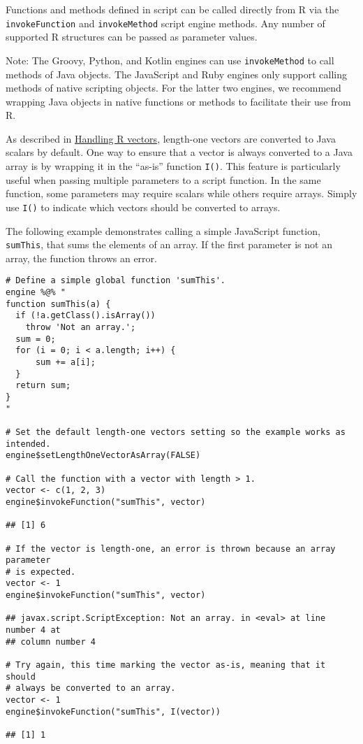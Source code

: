 \documentclass[
article,
11pt, %
a4paper, %
oneside, %
headinclude,footinclude, %
]{scrartcl}
\theoremstyle{definition} %
\theoremstyle{plain} %
\theoremstyle{remark} %
\newcommand{\code}[1]{\texttt{#1}}
\newcommand{\strong}[1]{\texorpdfstring{{\normalfont\fontseries{b}\selectfont #1}}{#1}}
\begin{document}
Functions and methods defined in script can be called directly from R via the \code{invokeFunction} and \code{invokeMethod} script engine methods. Any number of supported R structures can be passed as parameter values.

\strong{Note:} The Groovy, Python, and Kotlin engines can use \code{invokeMethod} to call methods of Java objects. The JavaScript and Ruby engines only support calling methods of native scripting objects. For the latter two engines, we recommend wrapping Java objects in native functions or methods to facilitate their use from R.

As described in \hyperlink{handling-r-vectors}{Handling R vectors}, length-one vectors are converted to Java scalars by default. One way to ensure that a vector is always converted to a Java array is by wrapping it in the ``as-is'' function \code{I()}. This feature is particularly useful when passing multiple parameters to a script function. In the same function, some parameters may require scalars while others require arrays. Simply use \code{I()} to indicate which vectors should be converted to arrays.

The following example demonstrates calling a simple JavaScript function, \code{sumThis}, that sums the elements of an array. If the first parameter is not an array, the function throws an error.

\begin{verbatim}
# Define a simple global function 'sumThis'.
engine %@% "
function sumThis(a) {
  if (!a.getClass().isArray())
    throw 'Not an array.';
  sum = 0;
  for (i = 0; i < a.length; i++) {
      sum += a[i];
  }
  return sum;
}
"

# Set the default length-one vectors setting so the example works as intended.
engine$setLengthOneVectorAsArray(FALSE)

# Call the function with a vector with length > 1.
vector <- c(1, 2, 3)
engine$invokeFunction("sumThis", vector)

## [1] 6

# If the vector is length-one, an error is thrown because an array parameter
# is expected.
vector <- 1
engine$invokeFunction("sumThis", vector)

## javax.script.ScriptException: Not an array. in <eval> at line number 4 at
## column number 4

# Try again, this time marking the vector as-is, meaning that it should
# always be converted to an array.
vector <- 1
engine$invokeFunction("sumThis", I(vector))

## [1] 1
\end{verbatim}
\end{document}
